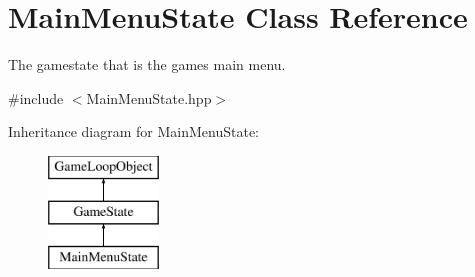 \hypertarget{class_main_menu_state}{}\section{Main\+Menu\+State Class Reference}
\label{class_main_menu_state}


The gamestate that is the game\textquotesingle{}s main menu.  




{\ttfamily \#include $<$Main\+Menu\+State.\+hpp$>$}

Inheritance diagram for Main\+Menu\+State\+:\begin{figure}[H]
\begin{center}
\leavevmode
\includegraphics[height=3.000000cm]{class_main_menu_state}
\end{center}
\end{figure}
